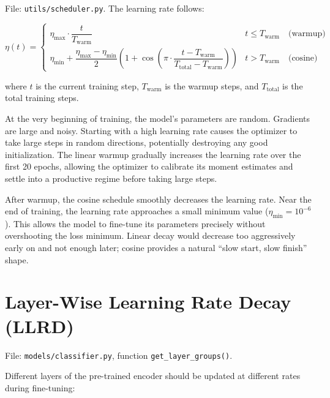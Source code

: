 \documentclass[12pt, a4paper]{report}
\begin{document}
File: \texttt{utils/scheduler.py}. The learning rate follows:

\begin{equation}
\eta(t) = \begin{cases}
\eta_{\text{max}} \cdot \dfrac{t}{T_{\text{warm}}} & t \leq T_{\text{warm}} \quad \text{(warmup)} \\[12pt]
\eta_{\text{min}} + \dfrac{\eta_{\text{max}} - \eta_{\text{min}}}{2}\left(1 + \cos\!\left(\pi \cdot \dfrac{t - T_{\text{warm}}}{T_{\text{total}} - T_{\text{warm}}}\right)\right) & t > T_{\text{warm}} \quad \text{(cosine)}
\end{cases}
\end{equation}

where $t$ is the current training step, $T_{\text{warm}}$ is the warmup steps, and $T_{\text{total}}$ is the total training steps.

\begin{conceptbox}
At the very beginning of training, the model's parameters are random. Gradients are large and noisy. Starting with a high learning rate causes the optimizer to take large steps in random directions, potentially destroying any good initialization. The linear warmup gradually increases the learning rate over the first 20 epochs, allowing the optimizer to calibrate its moment estimates and settle into a productive regime before taking large steps.
\end{conceptbox}

\begin{conceptbox}
After warmup, the cosine schedule smoothly decreases the learning rate. Near the end of training, the learning rate approaches a small minimum value ($\eta_{\text{min}} = 10^{-6}$). This allows the model to fine-tune its parameters precisely without overshooting the loss minimum. Linear decay would decrease too aggressively early on and not enough later; cosine provides a natural ``slow start, slow finish'' shape.
\end{conceptbox}

\section{Layer-Wise Learning Rate Decay (LLRD)}

File: \texttt{models/classifier.py}, function \texttt{get\_layer\_groups()}.

Different layers of the pre-trained encoder should be updated at different rates during fine-tuning:
\end{document}
